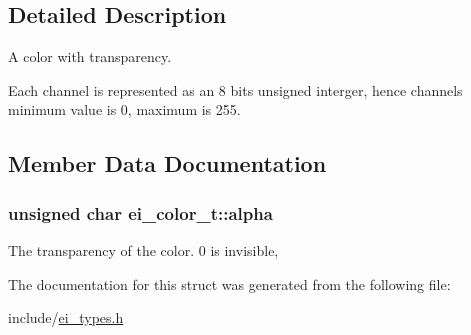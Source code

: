 \subsection{Detailed Description}
A color with transparency. 

Each channel is represented as an 8 bits unsigned interger, hence channel\textquotesingle{}s minimum value is 0, maximum is 255. 

\subsection{Member Data Documentation}
\subsubsection[{\texorpdfstring{alpha}{alpha}}]{\setlength{\rightskip}{0pt plus 5cm}unsigned char ei\+\_\+color\+\_\+t\+::alpha}\hypertarget{structei__color__t_af213a14356db920b1a04f5270263ae61}{}\label{structei__color__t_af213a14356db920b1a04f5270263ae61}
The transparency of the color. 0 is invisible, 

The documentation for this struct was generated from the following file\+:\begin{DoxyCompactItemize}
\item 
include/\hyperlink{ei__types_8h}{ei\+\_\+types.\+h}\end{DoxyCompactItemize}
